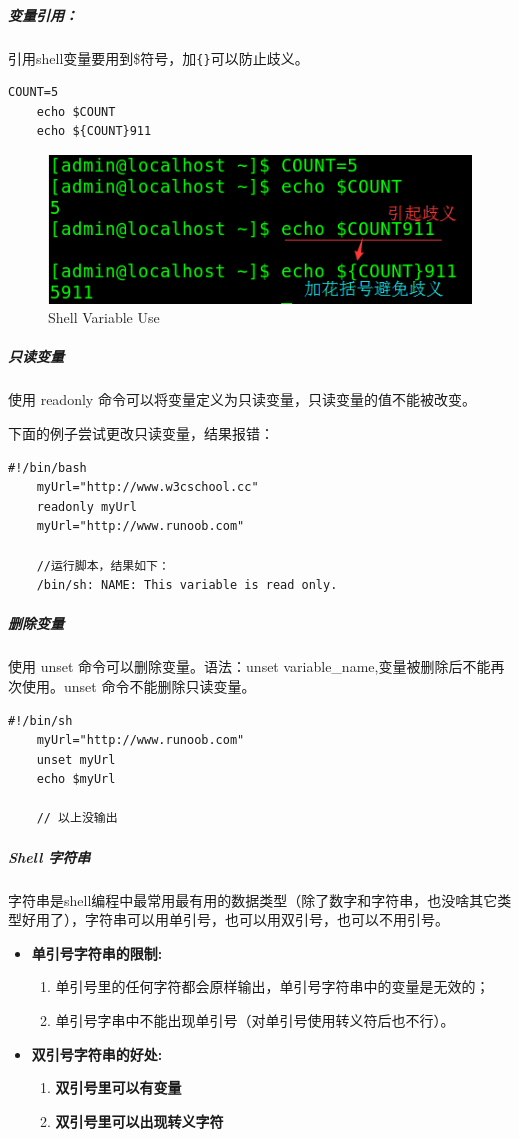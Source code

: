 \documentclass[UTF8,a4paper,12pt]{ctexbook}
\begin{document}
				\subparagraph{变量引用：}引用shell变量要用到\$符号，加\verb|{}|可以防止歧义。
					\begin{lstlisting}[frame=L,xleftmargin=.06\textwidth]
	COUNT=5
	echo $COUNT
	echo ${COUNT}911
					\end{lstlisting}
				
					\begin{figure}[h]
						\centering
						\includegraphics[scale = 0.7]{figure/ShellRefVariable.png}
						\caption{Shell Variable Use}
					\end{figure}
				\subparagraph{只读变量}
					使用 readonly 命令可以将变量定义为只读变量，只读变量的值不能被改变。
					
					下面的例子尝试更改只读变量，结果报错：
					\begin{lstlisting}[frame=L,xleftmargin=.06\textwidth]
	#!/bin/bash
	myUrl="http://www.w3cschool.cc"
	readonly myUrl
	myUrl="http://www.runoob.com"
	
	//运行脚本，结果如下：
	/bin/sh: NAME: This variable is read only.
					\end{lstlisting}
					
				\subparagraph{删除变量}
					使用 unset 命令可以删除变量。语法：unset variable\_name,变量被删除后不能再次使用。unset 命令不能删除只读变量。
					\begin{lstlisting}[frame=L,xleftmargin=.06\textwidth]
	#!/bin/sh
	myUrl="http://www.runoob.com"
	unset myUrl
	echo $myUrl
	
	// 以上没输出
					\end{lstlisting}
					
				\subparagraph{Shell 字符串}
					字符串是shell编程中最常用最有用的数据类型（除了数字和字符串，也没啥其它类型好用了），字符串可以用单引号，也可以用双引号，也可以不用引号。
					\begin{itemize}
						\item \textbf{单引号字符串的限制:}
							\begin{enumerate}
								\item 单引号里的任何字符都会原样输出，单引号字符串中的变量是无效的；
								\item 单引号字串中不能出现单引号（对单引号使用转义符后也不行）。
							\end{enumerate}
						
						\item \textbf{双引号字符串的好处:}
							\begin{enumerate}
								\item \textbf{双引号里可以有变量}
								\item \textbf{双引号里可以出现转义字符}
							\end{enumerate}
					\end{itemize}
					
\end{document}
